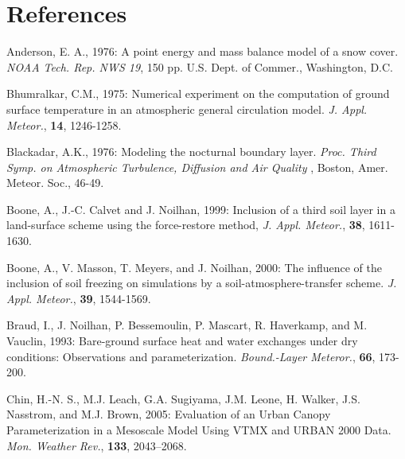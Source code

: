 \section{References}

\begin{description}

\item
Anderson, E. A., 1976:
A point energy and mass balance model of a snow cover.
{\it NOAA Tech. Rep. NWS 19}, 150 pp. U.S. Dept. of
Commer., Washington, D.C.

\item
Bhumralkar, C.M., 1975:
Numerical experiment on the computation of ground surface
temperature in an atmospheric general circulation model.
{\em J. Appl. Meteor.}, {\bf 14}, 1246-1258.

\item
Blackadar, A.K., 1976:
Modeling the nocturnal boundary layer.
{\em Proc. Third Symp. on Atmospheric Turbulence,
Diffusion and Air Quality }, Boston, Amer. Meteor. Soc., 46-49.


\item
Boone, A.,
J.-C. Calvet and J. Noilhan, 1999:
Inclusion of a third soil layer in a
land-surface scheme using the force-restore method,
{\em J. Appl. Meteor.},
{\bf 38},
1611-1630.

\item
Boone, A.,
V. Masson, T. Meyers, and J. Noilhan, 2000:
The influence of the inclusion of soil freezing
on simulations by a soil-atmosphere-transfer scheme.
{\em J. Appl. Meteor.}, {\bf 39}, 1544-1569.

\item
Braud, I., J. Noilhan, P. Bessemoulin, P. Mascart, R. Haverkamp,
and M. Vauclin, 1993:
Bare-ground surface heat and water exchanges under dry conditions:
Observations and parameterization.
{\em Bound.-Layer Meteror.},
{\bf 66},
173-200.

\item
Chin, H.-N. S., M.J. Leach, G.A. Sugiyama, J.M. Leone, H. Walker, J.S. Nasstrom, and M.J. Brown, 2005:
Evaluation of an Urban Canopy Parameterization in a Mesoscale Model Using VTMX and URBAN 2000 Data.
{\em Mon. Weather Rev.}, {\bf 133}, 2043–2068.


\end{description}
